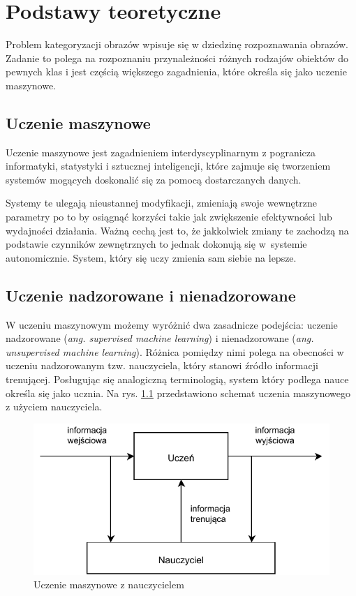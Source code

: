 \chapter{Podstawy teoretyczne}

Problem kategoryzacji obrazów wpisuje się w dziedzinę rozpoznawania obrazów. Zadanie to polega na rozpoznaniu przynależności różnych rodzajów obiektów do pewnych klas\cite{Tad91} i jest częścią większego zagadnienia, które określa się jako uczenie maszynowe.

\section{Uczenie maszynowe}

Uczenie maszynowe jest zagadnieniem interdyscyplinarnym z pogranicza informatyki, statystyki i sztucznej inteligencji, które zajmuje się tworzeniem systemów mogących doskonalić się za pomocą dostarczanych danych.

Systemy te ulegają nieustannej modyfikacji, zmieniają swoje wewnętrzne parametry po to by osiągnąć korzyści takie jak zwiększenie efektywności lub wydajności działania. Ważną cechą jest to, że jakkolwiek zmiany te zachodzą na podstawie czynników zewnętrznych to jednak dokonują się w~systemie autonomicznie. System, który się uczy zmienia sam siebie na lepsze.\cite{CICHOSZ00}

\section{Uczenie nadzorowane i nienadzorowane}

W uczeniu maszynowym możemy wyróżnić dwa zasadnicze podejścia: uczenie nadzorowane (\emph{ang. supervised machine learning}) i nienadzorowane (\emph{ang. unsupervised machine learning}). Różnica pomiędzy nimi polega na obecności w uczeniu nadzorowanym tzw. nauczyciela, który stanowi źródło informacji trenującej. Posługując się analogiczną terminologią, system który podlega nauce określa się jako ucznia. Na rys. \ref{fig:supervised-learning} przedstawiono schemat uczenia maszynowego z użyciem nauczyciela.

\begin{figure}[h]
	\centering
	\includegraphics{graphics/01_podstawy_teoretyczne/supervised-learning.pdf}
	\caption{Uczenie maszynowe z nauczycielem \cite{CICHOSZ00}}
	\label{fig:supervised-learning}
\end{figure}

